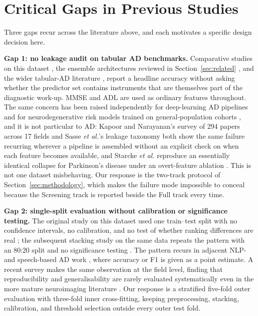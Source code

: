 \documentclass[conference]{IEEEtran}
\begin{document}
\section{Critical Gaps in Previous Studies}
\label{sec:gaps}
Three gaps recur across the literature above, and each motivates a specific design decision here.

\textbf{Gap 1: no leakage audit on tabular AD benchmarks.} Comparative studies on this dataset \cite{b13,b20,b37}, the ensemble architectures reviewed in Section~\ref{sec:related} \cite{b36,b38}, and the wider tabular-AD literature \cite{b1,b2}, report a headline accuracy without asking whether the predictor set contains instruments that are themselves part of the diagnostic work-up. MMSE and ADL are used as ordinary features throughout. The same concern has been raised independently for deep-learning AD pipelines \cite{b29} and for neurodegenerative risk models trained on general-population cohorts \cite{b26}, and it is not particular to AD: Kapoor and Narayanan's survey of 294 papers across 17 fields \cite{b40} and Sasse \textit{et al.}'s leakage taxonomy \cite{b41} both show the same failure recurring wherever a pipeline is assembled without an explicit check on when each feature becomes available, and Starcke \textit{et al.} reproduce an essentially identical collapse for Parkinson's disease under an overt-feature ablation \cite{b42}. This is not one dataset misbehaving. Our response is the two-track protocol of Section~\ref{sec:methodology}, which makes the failure mode impossible to conceal because the Screening track is reported beside the Full track every time.

\textbf{Gap 2: single-split evaluation without calibration or significance testing.} The original study on this dataset used one train--test split with no confidence intervals, no calibration, and no test of whether ranking differences are real \cite{b13}; the subsequent stacking study on the same data repeats the pattern with an 80:20 split and no significance testing \cite{b37}. The pattern recurs in adjacent NLP- and speech-based AD work \cite{b3,b7,b11}, where accuracy or F1 is given as a point estimate. A recent survey makes the same observation at the field level, finding that reproducibility and generalisability are rarely evaluated systematically even in the more mature neuroimaging literature \cite{b25}. Our response is a stratified five-fold outer evaluation with three-fold inner cross-fitting, keeping preprocessing, stacking, calibration, and threshold selection outside every outer test fold.
\end{document}
